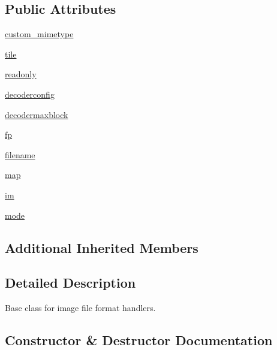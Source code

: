 \subsection*{Public Attributes}
\begin{DoxyCompactItemize}
\item 
\hyperlink{classPIL_1_1ImageFile_1_1ImageFile_a07372e77e1cbbb8cb826fd638b0ca16b}{custom\+\_\+mimetype}
\item 
\hyperlink{classPIL_1_1ImageFile_1_1ImageFile_a8b3132a6c5a7592c13a29abaf039c2a0}{tile}
\item 
\hyperlink{classPIL_1_1ImageFile_1_1ImageFile_a1d6e4334dc0e82efaceb7dee7804bfe2}{readonly}
\item 
\hyperlink{classPIL_1_1ImageFile_1_1ImageFile_a2438cd04492593323ac7d39980f04ae2}{decoderconfig}
\item 
\hyperlink{classPIL_1_1ImageFile_1_1ImageFile_a1b1b16ba77ee4a530c371f763e5f4ae3}{decodermaxblock}
\item 
\hyperlink{classPIL_1_1ImageFile_1_1ImageFile_a089dd3e057c67403a36d73fcdae09009}{fp}
\item 
\hyperlink{classPIL_1_1ImageFile_1_1ImageFile_a8c0859e3d3dc0631584f800d1daeaee7}{filename}
\item 
\hyperlink{classPIL_1_1ImageFile_1_1ImageFile_a686300ab3f2affc96a51e1b9ed9ef632}{map}
\item 
\hyperlink{classPIL_1_1ImageFile_1_1ImageFile_ad63736912bacecd6f3e4159e62ea76da}{im}
\item 
\hyperlink{classPIL_1_1ImageFile_1_1ImageFile_a7e00ff2ada2d229869dad1252c585c67}{mode}
\end{DoxyCompactItemize}
\subsection*{Additional Inherited Members}


\subsection{Detailed Description}
\begin{DoxyVerb}Base class for image file format handlers.\end{DoxyVerb}
 

\subsection{Constructor \& Destructor Documentation}
\mbox{\label{classPIL_1_1ImageFile_1_1ImageFile_ad38bf9c49fa69c05ed68d5237be48314}} 
